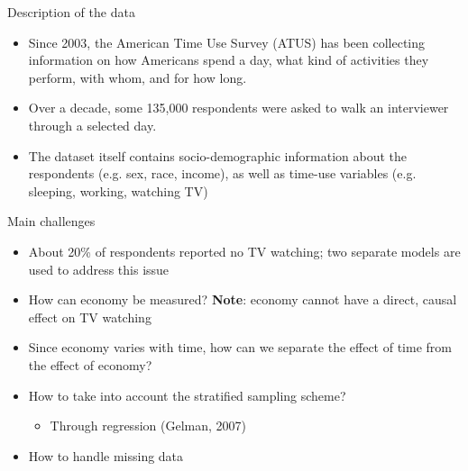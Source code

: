 \documentclass[final]{beamer}
\newcounter{acolumn}%
\begin{document}
\begin{frame}
\begin{acolumns}[t]
          \begin{column}{.24\linewidth}
            \begin{block}{Description of the data}
              \begin{itemize}
              	\item Since 2003, the American Time Use Survey (ATUS) has been collecting information on how Americans spend a day, what kind of activities they perform, with whom, and for how long.
              	\item Over a decade, some 135,000 respondents were asked to walk an interviewer through a selected day.
              	\item The dataset itself contains socio-demographic information about the respondents (e.g. sex, race, income), as well as time-use variables (e.g. sleeping, working, watching TV)
              \end{itemize}
              
            \end{block}
    
          
          
          \begin{block}{Main challenges}
                  		  \begin{itemize}
                  		  	\item About 20\% of respondents reported no TV watching; two separate models are used to address this issue
                  		  	
                  		  	\item How can economy be measured? \textbf{Note}: economy cannot have a direct, causal effect on TV watching
                  		  	
                  		  	\item Since economy varies with time, how can we separate the effect of time from the effect of economy?
                  		  	
                  		  	\item How to take into account the stratified sampling scheme?
                  		  	\begin{itemize}
                  		  		\item Through regression (Gelman, 2007)
                  		  	\end{itemize}
                  		  	
                  		  	\item How to handle missing data
                  		  \end{itemize}
                  			

\end{block}
\end{column}
\end{acolumns}
\end{frame}
\end{document}
